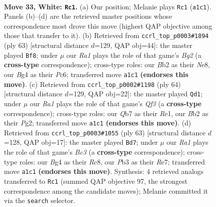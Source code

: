 \documentclass[11pt]{article}
\begin{document}
\clearpage

\begin{figure}[p]\centering
\begin{subfigure}{0.46\textwidth}\centering
\resizebox{\linewidth}{!}{%
\newchessgame
\chessboard[
  setfen={1n1qkb1r/1Q2n3/r1p3p1/p2p2P1/3P1PBp/1P5P/1BP4R/R2N1K2 w - - 9 33},
  showmover=false,
  pgfstyle=straightmove, color=movearrow, markmove={a1-c1}
]}
\caption{}
\end{subfigure}\hfill
\begin{subfigure}{0.46\textwidth}\centering
\resizebox{\linewidth}{!}{%
\newchessgame
\chessboard[
  setfen={r3n1k1/1p3pb1/2p3pp/4P3/p3QP2/PbN3PP/1P1RNqBK/8 b - - 4 32},
  showmover=false,
  pgfstyle=straightmove, color=movearrow, markmove={g7-f8}
]}
\caption{}
\end{subfigure}
\\[4pt]
\begin{subfigure}{0.46\textwidth}\centering
\resizebox{\linewidth}{!}{%
\newchessgame
\chessboard[
  setfen={6k1/3q1rpp/2pbnp2/2p5/p1P4P/P1BP1Q2/1P3NP1/4R1K1 w - - 0 33},
  showmover=false,
  pgfstyle=straightmove, color=movearrow, markmove={f3-d1}
]}
\caption{}
\end{subfigure}\hfill
\begin{subfigure}{0.46\textwidth}\centering
\resizebox{\linewidth}{!}{%
\newchessgame
\chessboard[
  setfen={2r3k1/4rp2/1qbpnbp1/1p5p/1P2Pp2/R1PQ1N1P/B2N1PP1/4R1K1 b - - 9 32},
  showmover=false,
  pgfstyle=straightmove, color=movearrow, markmove={c6-d7}
]}
\caption{}
\end{subfigure}
\caption{\textbf{Move 33, White: \texttt{Rc1}.} (a) Our position; Melanie plays \texttt{Rc1} (\texttt{a1c1}). Panels (b)--(d) are the retrieved master positions whose correspondence most drove this move (highest QAP objective among those that transfer to it). (b) Retrieved from \texttt{ccrl\_top\_p0003\#1894} (ply 63) [structural distance $d$=129, QAP obj=44]: the master played \texttt{Bf8}; under $\mu$ our \emph{Ra1} plays the role of that game's \emph{Bg2} (a \textbf{cross-type} correspondence); cross-type roles: our \emph{B}b2 as their \emph{N}e8, our \emph{B}g4 as their \emph{P}c6; transferred move \texttt{a1c1} \textbf{(endorses this move)}. (c) Retrieved from \texttt{ccrl\_top\_p0002\#1198} (ply 64) [structural distance $d$=129, QAP obj=22]: the master played \texttt{Qd1}; under $\mu$ our \emph{Ra1} plays the role of that game's \emph{Qf3} (a \textbf{cross-type} correspondence); cross-type roles: our \emph{Q}b7 as their \emph{R}e1, our \emph{B}b2 as their \emph{P}g2; transferred move \texttt{a1c1} \textbf{(endorses this move)}. (d) Retrieved from \texttt{ccrl\_top\_p0003\#1055} (ply 63) [structural distance $d$=128, QAP obj=17]: the master played \texttt{Bd7}; under $\mu$ our \emph{Ra1} plays the role of that game's \emph{Bc3} (a \textbf{cross-type} correspondence); cross-type roles: our \emph{B}g4 as their \emph{R}c8, our \emph{P}b3 as their \emph{R}e7; transferred move \texttt{a1c1} \textbf{(endorses this move)}. Synthesis: 4 retrieved analogs transferred to \texttt{Rc1} (summed QAP objective 97, the strongest correspondence among the candidate moves); Melanie committed it via the \texttt{search} selector.}
\label{fig:thought-m64}
\end{figure}
\end{document}
